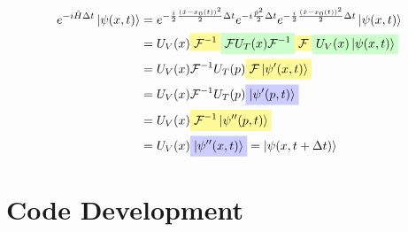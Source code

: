 \documentclass[rmp,10pt,onecolumn,fleqn,notitlepage]{revtex4-1}
\newcommand{\mathcolorbox}[2]{\colorbox{#1}{$\displaystyle #2$}}
\begin{document}
\begin{enumerate}
\begin{equation}
\begin{split}
e^{- i \hat{H} \Delta t }  \ket{\psi (x,t)}  & = e^{-\frac{i}{2} \frac{(\hat{x} - x_0(t))^2}{2}   \Delta t} e^{ -i \frac{ \hat{p}^2}{2} \Delta t}  e^{-\frac{i}{2} \frac{(\hat{x} - x_0(t))^2}{2}  \Delta t}  \ket{\psi (x,t)}      \\
& = U_V (x) \mathcolorbox{yellow!40}{ \mathcal{F}^{-1} } \mathcolorbox{green!20}{ \mathcal{F} U_T (x) \mathcal{F}^{-1} } \mathcolorbox{yellow!40}{ \mathcal{F} } \mathcolorbox{green!20}{U_V (x) \ket{\psi (x,t)} } \\
& = U_V (x) \mathcal{F}^{-1} U_T (p) \mathcolorbox{yellow!40}{ \mathcal{F} \ket{\psi'(x,t)} }  \\
& = U_V (x) \mathcal{F}^{-1} U_T (p) \mathcolorbox{blue!20}{  \ket{\psi' (p,t)} }\\
& = U_V (x) \mathcolorbox{yellow!40}{  \mathcal{F}^{-1} \ket{\psi'' (p,t)} } \\
&= U_V(x) \mathcolorbox{blue!20}{  \ket{\psi'' (x,t)} } = \ket{\psi (x,t + \Delta t)}
\end{split}
\end{equation}

\end{enumerate}





\section{Code Development}
\end{document}
